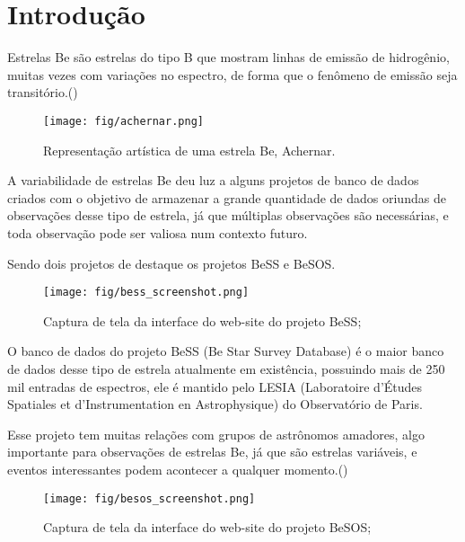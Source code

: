 \chapter{Introdução}

Estrelas Be são estrelas do tipo B que mostram linhas de emissão de hidrogênio, muitas vezes com variações no espectro, de forma que o fenômeno de emissão seja transitório.(\citealt{classical_be})

\begin{figure}[!ht]
\begin{center}
\setcaptionmargin{1cm}
\texttt{[image: fig/achernar.png]}
\caption[Representação Artística de Achernar]{Representação artística de uma estrela Be, Achernar.} 
\label{achernar_fig}
\end{center}
\end{figure}

A variabilidade de estrelas Be deu luz a alguns projetos de banco de dados criados com o objetivo de armazenar a grande quantidade de dados oriundas de observações desse tipo de estrela, já que múltiplas observações são necessárias, e toda observação pode ser valiosa num contexto futuro.

Sendo dois projetos de destaque os projetos BeSS e BeSOS.

\begin{figure}[!ht]
\begin{center}
\setcaptionmargin{1cm}
\texttt{[image: fig/bess\_screenshot.png]}
\caption[Screenshot do BeSS]{Captura de tela da interface do web-site do projeto BeSS;} 
\label{bess_screenshot_fig}
\end{center}
\end{figure}

O banco de dados do projeto BeSS (Be Star Survey Database) é o maior banco de dados desse tipo de estrela atualmente em existência, possuindo mais de 250 mil entradas de espectros, ele é mantido pelo LESIA (Laboratoire d'Études Spatiales et d'Instrumentation en Astrophysique) do Observatório de Paris.

Esse projeto tem muitas relações com grupos de astrônomos amadores, algo importante para observações de estrelas Be, já que são estrelas variáveis, e eventos interessantes podem acontecer a qualquer momento.(\citealt{bess_database})

\begin{figure}[!ht]
\begin{center}
\setcaptionmargin{1cm}
\texttt{[image: fig/besos\_screenshot.png]}
\caption[Screenshot do BeSOS]{Captura de tela da interface do web-site do projeto BeSOS;} 
\label{besos_screenshot_fig}
\end{center}
\end{figure}

